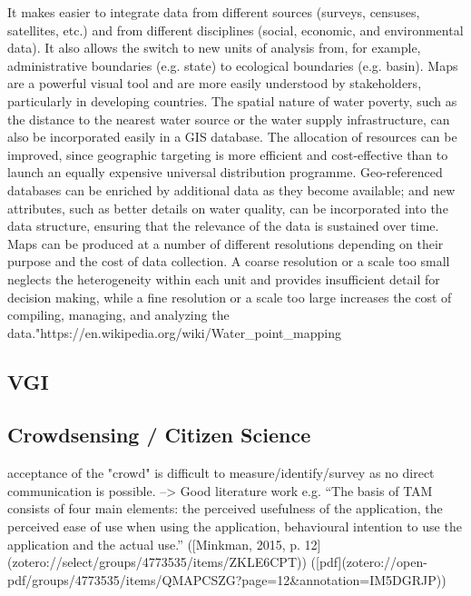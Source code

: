 {It makes easier to integrate data from different sources (surveys, censuses, satellites, etc.) and from different disciplines (social, economic, and environmental data). It also allows the switch to new units of analysis from, for example, administrative boundaries (e.g. state) to ecological boundaries (e.g. basin).
Maps are a powerful visual tool and are more easily understood by stakeholders, particularly in developing countries.
The spatial nature of water poverty, such as the distance to the nearest water source or the water supply infrastructure, can also be incorporated easily in a GIS database.
The allocation of resources can be improved, since geographic targeting is more efficient and cost-effective than to launch an equally expensive universal distribution programme.
Geo-referenced databases can be enriched by additional data as they become available; and new attributes, such as better details on water quality, can be incorporated into the data structure, ensuring that the relevance of the data is sustained over time.
Maps can be produced at a number of different resolutions depending on their purpose and the cost of data collection. A coarse resolution or a scale too small neglects the heterogeneity within each unit and provides insufficient detail for decision making, while a fine resolution or a scale too large increases the cost of compiling, managing, and analyzing the data."https://en.wikipedia.org/wiki/Water_point_mapping


\subsection{VGI}



\subsection{Crowdsensing / Citizen Science}


acceptance of the "crowd" is difficult to measure/identify/survey as no direct communication is possible. --> Good literature work e.g. “The basis of TAM consists of four main elements: the perceived usefulness of the application, the perceived ease of use when using the application, behavioural intention to use the application and the actual use.” ([Minkman, 2015, p. 12](zotero://select/groups/4773535/items/ZKLE6CPT)) ([pdf](zotero://open-pdf/groups/4773535/items/QMAPCSZG?page=12&annotation=IM5DGRJP))

}
